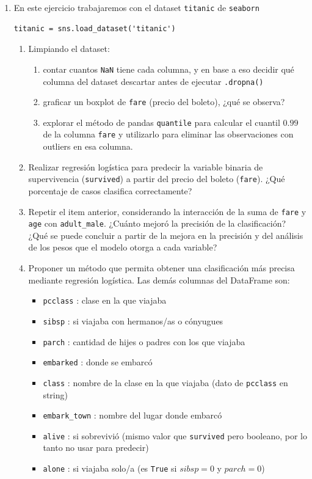 \documentclass[a4paper,11pt]{article}
\theoremstyle{definition}
\begin{document}
\begin{enumerate}
    \item En este ejercicio trabajaremos con el dataset \verb|titanic| de \verb|seaborn|
\begin{lstlisting}
titanic = sns.load_dataset('titanic')
\end{lstlisting}
\begin{enumerate}
\item Limpiando el dataset:
\begin{enumerate}
    \item contar cuantos \verb|NaN| tiene cada columna, y en base a eso decidir qué columna del dataset descartar antes de ejecutar \verb|.dropna()|
    \item graficar un boxplot de \verb|fare| (precio del boleto), ¿qué se observa?
    \item explorar el método de pandas \verb|quantile| para calcular el cuantil $0.99$ de la columna \verb|fare| y utilizarlo para eliminar las observaciones con outliers en esa columna.
\end{enumerate}
\item Realizar regresión logística para predecir la variable binaria de supervivencia (\verb|survived|) a partir del precio del boleto (\verb|fare|). ¿Qué porcentaje de casos clasifica correctamente?
\item Repetir el item anterior, considerando la interacción de la suma de \verb|fare| y \verb|age| con \verb|adult_male|. ¿Cuánto mejoró la precisión de la clasificación? ¿Qué se puede concluir a partir de la mejora en la precisión y del análisis de los pesos que el modelo otorga a cada variable?
\item Proponer un método que permita obtener una clasificación más precisa mediante regresión logística. Las demás columnas del DataFrame son:
\begin{itemize}
    \item \verb|pcclass| : clase en la que viajaba
    \item \verb|sibsp| : si viajaba con hermanos/as o cónyugues
    \item \verb|parch| : cantidad de hijes o padres con los que viajaba
    \item \verb|embarked| : donde se embarcó
    \item \verb|class| : nombre de la clase en la que viajaba (dato de \verb|pcclass| en string)
    \item \verb|embark_town| : nombre del lugar donde embarcó
    \item \verb|alive| : si sobrevivió (mismo valor que \verb|survived| pero booleano, por lo tanto no usar para predecir)
    \item \verb|alone| : si viajaba solo/a (es \verb|True| si $sibsp=0$ y $parch=0$)
\end{itemize}
\end{enumerate}


\end{enumerate}
\end{document}
